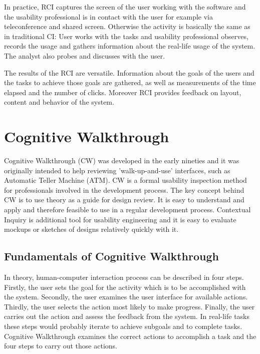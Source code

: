 \documentclass[12pt,a4paper,oneside,pdftex]{report}
\begin{document}
In practice, RCI captures the screen of the user working with the software and the usability professional is in contact with the user for example via teleconference and shared screen. Otherwise the activity is basically the same as in traditional CI: User works with the tasks and usability professional observes, records the usage and gathers information about the real-life usage of the system. The analyst also probes and discusses with the user. \cite{RefWorks:32}

The results of the RCI are versatile. Information about the goals of the users and the tasks to achieve those goals are gathered, as well as measurements of the time elapsed and the number of clicks. Moreover RCI provides feedback on layout, content and behavior of the system. \cite{RefWorks:32}
 
\section{Cognitive Walkthrough}
\label{sec:cognitivewalkthrough}

Cognitive Walkthrough (CW) was developed in the early nineties and it was originally intended to help reviewing 'walk-up-and-use' interfaces, such as Automatic Teller Machine (ATM). CW is a formal usability inspection method for professionals involved in the development process. The key concept behind CW is to use theory as a guide for design review. It is easy to understand and apply and therefore feasible to use in a regular development process. \cite{RefWorks:19, RefWorks:18} Contextual Inquiry is additional tool for usability engineering and it is easy to evaluate mockups or sketches of designs relatively quickly with it. \cite{RefWorks:34}

\subsection{Fundamentals of Cognitive Walkthrough}

In theory, human-computer interaction process can be described in four steps. Firstly, the user sets the goal for the activity which is to be accomplished with the system. Secondly, the user examines the user interface for available actions. Thirdly, the user selects the action most likely to make progress. Finally, the user carries out the action and assess the feedback from the system. In real-life tasks these steps would probably iterate to achieve subgoals and to complete tasks. Cognitive Walkthrough examines the correct actions to accomplish a task and the four steps to carry out those actions. \cite{RefWorks:34}
\end{document}
